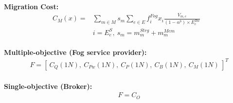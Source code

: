 \documentclass{article}
\begin{document}
\noindent\textbf{Migration Cost:}\\[6pt]
\begin{equation*}
\begin{split}
C_M(x) = & \sum_{m\in M} s_m \sum_{e\in E} f^{Fog}_i x_i \frac{V_{m, e}}{\left(1 - \alpha^b\right) \times E^{Bw}_{e}} \\[6pt]
&i = E^S_e,~ s_m = m^{Strg}_{m} + m^{Mem}_{m}
\end{split}
\end{equation*}\\[6pt]

\pagebreak
\noindent\textbf{Multiple-objective (Fog service provider):}\\[6pt]
\begin{equation*}
\begin{split}
& F = \left[~C_{Q}(1N),~ C_{Pw}(1N),~ C_P(1N),~ C_B(1N),~ C_M(1N)~\right]^T
\end{split}
\end{equation*}\\[6pt]

\noindent\textbf{Single-objective (Broker):}\\[6pt]
\begin{equation*}
\begin{split}
& F = C_O
\end{split}
\end{equation*}\\[6pt]
\end{document}
